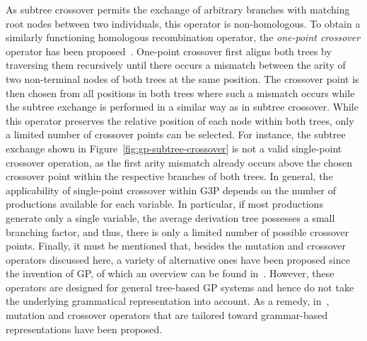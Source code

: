 As subtree crossover permits the exchange of arbitrary branches with matching root nodes between two individuals, this operator is non-homologous.
To obtain a similarly functioning homologous recombination operator, the \emph{one-point crossover} operator has been proposed~\cite{poli1998schema}.
One-point crossover first aligns both trees by traversing them recursively until there occurs a mismatch between the arity of two non-terminal nodes of both trees at the same position.
The crossover point is then chosen from all positions in both trees where such a mismatch occurs while the subtree exchange is performed in a similar way as in subtree crossover.
While this operator preserves the relative position of each node within both trees, only a limited number of crossover points can be selected.
For instance, the subtree exchange shown in Figure~\ref{fig:gp-subtree-crossover} is not a valid single-point crossover operation, as the first arity mismatch already occurs above the chosen crossover point within the respective branches of both trees.
In general, the applicability of single-point crossover within G3P depends on the number of productions available for each variable.
In particular, if most productions generate only a single variable, the average derivation tree possesses a small branching factor, and thus, there is only a limited number of possible crossover points.
Finally, it must be mentioned that, besides the mutation and crossover operators discussed here, a variety of alternative ones have been proposed since the invention of GP, of which an overview can be found in~\cite{poli2008field}.
However, these operators are designed for general tree-based GP systems and hence do not take the underlying grammatical representation into account. 
As a remedy, in~\cite{couchet2007crossover}, mutation and crossover operators that are tailored toward grammar-based representations have been proposed.

